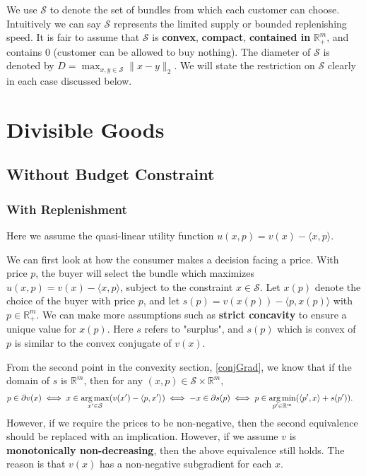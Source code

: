 \documentclass{article}
\newcommand{\ip}[2]{\left\langle #1, #2 \right \rangle}
\newcommand{\argmax}{\operatornamewithlimits{arg\,max}}
\newcommand{\argmin}{\operatornamewithlimits{arg\,min}}
\begin{document}
We use $\mathcal{S}$ to denote the set of bundles from which each customer can choose. Intuitively we can say $\mathcal{S}$ represents the limited supply or bounded replenishing speed. It is fair to assume that $\mathcal{S}$ is \textbf{convex}, \textbf{compact}, \textbf{contained in} $\mathbb{R}^m_+$, and contains $0$ (customer can be allowed to buy nothing). The diameter of $\mathcal{S}$ is denoted by $D=\max_{x,y\in \mathcal{S}}\|x-y\|_2$. We will state the restriction on $\mathcal{S}$ clearly in each case discussed below.

\section{Divisible Goods}
\subsection{Without Budget Constraint}
\subsubsection{With Replenishment}
Here we assume the quasi-linear utility function $u(x,p)=v(x)-\langle x,p\rangle$.

We can first look at how the consumer makes a decision facing a price. With price $p$, the buyer will select the bundle which maximizes $u(x,p)=v(x)-\langle x,p\rangle$, subject to the constraint $x\in\mathcal{S}$. Let $x(p)$ denote the choice of the buyer with price $p$, and let $s(p)=v(x(p))-\langle p,x(p)\rangle$ with $p\in \mathbb{R}_+^m$. We can make more assumptions such as \textbf{strict concavity} to ensure a unique value for $x(p)$. Here $s$ refers to "surplus", and $s(p)$ which is convex of $p$ is similar to the convex conjugate of $v(x)$.

From the second point in the convexity section, \eqref{conjGrad}, we know that if the domain of $s$ is $\mathbb{R}^m$, then for any $(x,p)\in \mathcal{S}\times \mathbb{R}^m$,
\begin{align}\label{dualPrice}
p \in \partial v(x)
\iff
x \in \argmax_{x'\in \mathcal{S}} ( v(x')-\ip{p}{x'} )
  &\iff
  -x \in \partial s(p)
  \iff
  p \in \argmin_{p'\in \mathbb{R}^m} ( \ip{p'}{x} + s(p') ).
\end{align}
However, if we require the prices to be non-negative, then the second equivalence should be replaced with an implication. However, if we assume $v$ is \textbf{monotonically non-decreasing}, then the above equivalence still holds. The reason is that $v(x)$ has a non-negative subgradient for each $x$.
\end{document}
